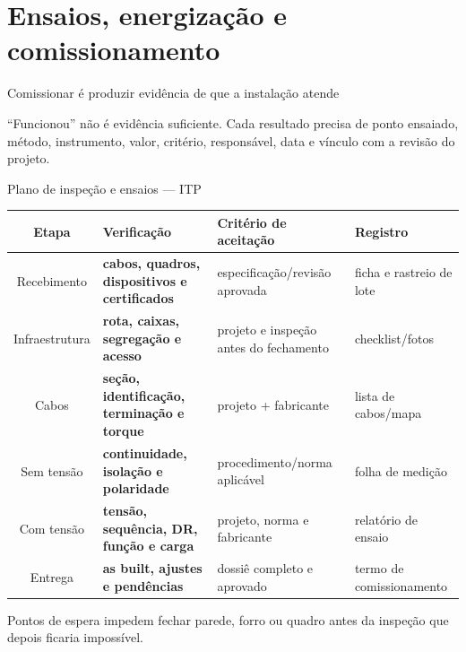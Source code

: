 
\section{Ensaios, energização e comissionamento}

\begin{frame}{Comissionar é produzir evidência de que a instalação atende}
\centering
{}
\vspace{5mm}
\begin{caixaAt}
“Funcionou” não é evidência suficiente. Cada resultado precisa de ponto ensaiado, método, instrumento, valor, critério, responsável, data e vínculo com a revisão do projeto.
\end{caixaAt}
\end{frame}

\begin{frame}{Plano de inspeção e ensaios — ITP}
\scriptsize
\begin{tabularx}{\textwidth}{c >{\bfseries}p{2.7cm}X X}
\toprule
Etapa & Verificação & Critério de aceitação & Registro \\
\midrule
Recebimento & cabos, quadros, dispositivos e certificados & especificação/revisão aprovada & ficha e rastreio de lote \\
Infraestrutura & rota, caixas, segregação e acesso & projeto e inspeção antes do fechamento & checklist/fotos \\
Cabos & seção, identificação, terminação e torque & projeto + fabricante & lista de cabos/mapa \\
Sem tensão & continuidade, isolação e polaridade & procedimento/norma aplicável & folha de medição \\
Com tensão & tensão, sequência, DR, função e carga & projeto, norma e fabricante & relatório de ensaio \\
Entrega & as built, ajustes e pendências & dossiê completo e aprovado & termo de comissionamento \\
\bottomrule
\end{tabularx}
\begin{caixaObs}
Pontos de espera impedem fechar parede, forro ou quadro antes da inspeção que depois ficaria impossível.
\end{caixaObs}
\end{frame}


